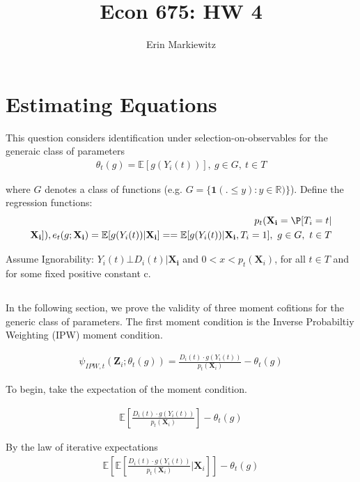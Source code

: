 \documentclass[12pt]{article}
\newcommand{\R}{\mathbb{R}}
\newcommand{\E}{\mathbb{E}}
\newcommand{\X}{\mathbf{X}}
\begin{document}
\title{Econ 675: HW 4}
\author{Erin Markiewitz}
\maketitle
\newpage
\tableofcontents
\newpage

\section{Estimating Equations}
This question considers identification under selection-on-observables for the generaic class of parameters
\begin{align*}
\theta_t(g) = \E[g(Y_i(t))], \ g \in G, \ t \in T
\end{align*}

where $G$ denotes a class of functions (e.g. $G = \{ \mathbf{1}(. \leq y) : y \in \R)\}$). Define the regression functions:
\begin{align*}
  p_t(\mathbf{X_i} = \P[T_i = t| \\
  \mathbf{X_i}]), e_t(g;\mathbf{X_i}) = \E[g(Y_i(t))|\mathbf{X_i}] = = \E[g(Y_i(t))|\mathbf{X_i}, T_i =1], \ g \in G, \ t \in T
\end{align*}

Assume Ignorability: $Y_i(t) \bot D_i(t) |\mathbf{X_i}$ and $0 < x < p_t(\X_i)$, for all $t \in T$ and for some fixed positive constant c.
\subsection{}
In the following section, we prove the validity of three moment cofitions for the generic class of parameters. The first moment condition is the Inverse Probabiltiy Weighting (IPW) moment condition.

\begin{align*}
\psi_{IPW,t}(\mathbf{Z}_i;\theta_t(g)) = \frac{D_i(t)\cdot g(Y_i(t))}{p_t(\X_i)} - \theta_t(g)
\end{align*}

To begin, take the expectation of the moment condition.

\begin{align*}
\E\left[\frac{D_i(t)\cdot g(Y_i(t))}{p_t(\X_i)}\right] - \theta_t(g)
\end{align*}

By the law of iterative expectations
\begin{align*}
  \E\left[\E\left[\frac{D_i(t) \cdot g(Y_i(t))}{p_t(\X_i)} |\X_i \right] \right] - \theta_t(g)
\end{align*}
\end{document}
